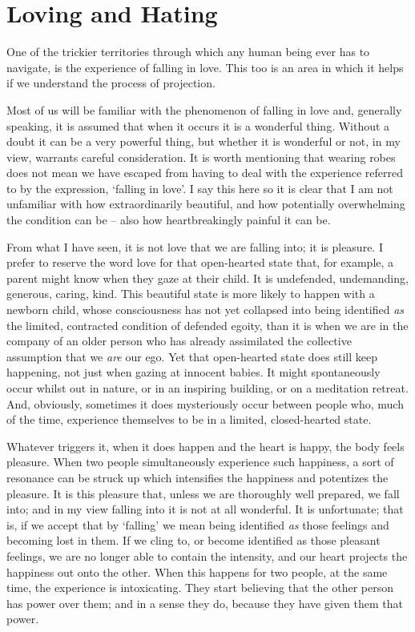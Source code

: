 \section{Loving and Hating}

One of the trickier territories through which any human being ever has
to navigate, is the experience of falling in love. This too is an area
in which it helps if we understand the process of projection.

Most of us will be familiar with the phenomenon of falling in love and,
generally speaking, it is assumed that when it occurs it is a wonderful
thing. Without a doubt it can be a very powerful thing, but whether it
is wonderful or not, in my view, warrants careful consideration. It is
worth mentioning that wearing robes does not mean we have escaped from
having to deal with the experience referred to by the expression,
`falling in love'. I say this here so it is clear that I am not
unfamiliar with how extraordinarily beautiful, and how potentially
overwhelming the condition can be -- also how heartbreakingly painful it
can be.

From what I have seen, it is not love that we are falling into; it is
pleasure. I prefer to reserve the word love for that open-hearted state
that, for example, a parent might know when they gaze at their child. It
is undefended, undemanding, generous, caring, kind. This beautiful state
is more likely to happen with a newborn child, whose consciousness has
not yet collapsed into being identified \emph{as} the limited,
contracted condition of defended egoity, than it is when we are in the
company of an older person who has already assimilated the collective
assumption that we \emph{are} our ego. Yet that open-hearted state does
still keep happening, not just when gazing at innocent babies. It might
spontaneously occur whilst out in nature, or in an inspiring building,
or on a meditation retreat. And, obviously, sometimes it does
mysteriously occur between people who, much of the time, experience
themselves to be in a limited, closed-hearted state.

Whatever triggers it, when it does happen and the heart is happy, the
body feels pleasure. When two people simultaneously experience such
happiness, a sort of resonance can be struck up which intensifies the
happiness and potentizes the pleasure. It is this pleasure that, unless
we are thoroughly well prepared, we fall into; and in my view falling
into it is not at all wonderful. It is unfortunate; that is, if we
accept that by `falling' we mean being identified \emph{as} those
feelings and becoming lost in them. If we cling to, or become identified
as those pleasant feelings, we are no longer able to contain the
intensity, and our heart projects the happiness out onto the other. When
this happens for two people, at the same time, the experience is
intoxicating. They start believing that the other person has power over
them; and in a sense they do, because they have given them that power.


